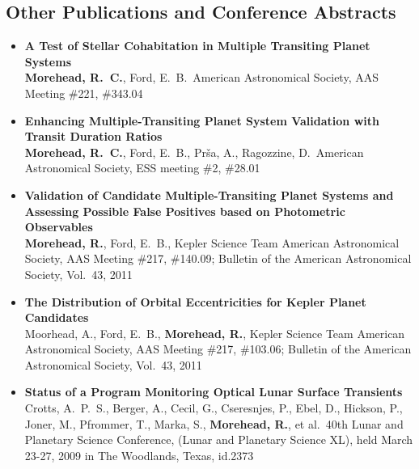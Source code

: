 \documentclass[12pt,letterpaper,sans]{moderncv} %
\begin{document}
\newpage
\subsection{Other Publications and Conference Abstracts}
\begin{itemize}
 \item \textbf{ A Test of Stellar Cohabitation in Multiple Transiting 
Planet Systems } \\ \textbf{Morehead, R.~C.}, Ford, E.~B.\ American Astronomical 
Society, AAS Meeting \#221, \#343.04 \\ 


 \item \textbf{ Enhancing Multiple-Transiting Planet System Validation with 
Transit Duration Ratios } \\ \textbf{Morehead, R.~C.}, Ford, E.~B., Pr{\v s}a, A., 
Ragozzine, D.\ American Astronomical Society, ESS meeting \#2, \#28.01 \\ 


 \item \textbf{ Validation of Candidate Multiple-Transiting Planet Systems 
and Assessing Possible False Positives based on Photometric Observables } 
\\ \textbf{Morehead, R.}, Ford, E.~B., Kepler Science Team American Astronomical 
Society, AAS Meeting \#217, \#140.09; Bulletin of the American 
Astronomical Society, Vol.~43, 2011 \\ 

 \item \textbf{ The Distribution of Orbital Eccentricities for Kepler 
Planet Candidates } \\ Moorhead, A., Ford, E.~B., \textbf{Morehead, R.}, Kepler 
Science Team American Astronomical Society, AAS Meeting \#217, \#103.06; 
Bulletin of the American Astronomical Society, Vol.~43, 2011 \\ 

 \item \textbf{ Status of a Program Monitoring Optical Lunar Surface 
Transients } \\ Crotts, A.~P.~S., Berger, A., Cecil, G., Cseresnjes, P., 
Ebel, D., Hickson, P., Joner, M., Pfrommer, T., Marka, S., \textbf{ Morehead, R.}, et 
al.\ 40th Lunar and Planetary Science Conference, (Lunar and Planetary 
Science XL), held March 23-27, 2009 in The Woodlands, Texas, id.2373 \\ 
\end{itemize}
\end{document}
